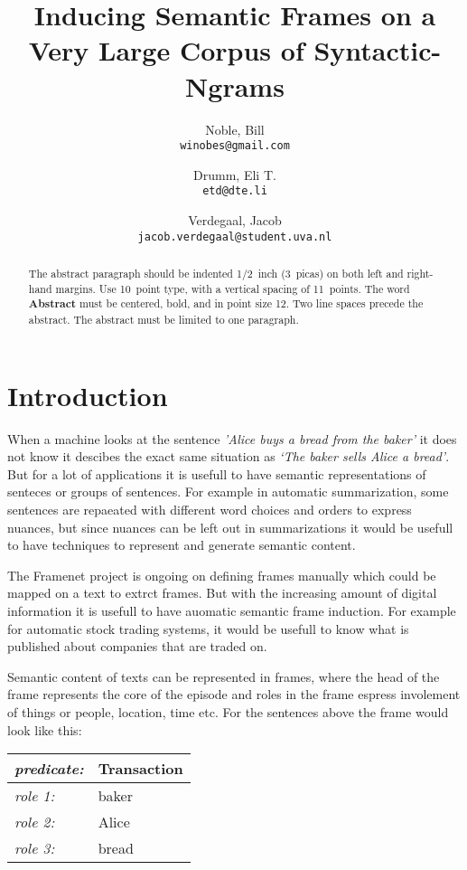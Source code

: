 \documentclass{article} %
\title{Inducing Semantic Frames on a Very Large Corpus of Syntactic-Ngrams}
\author{
    Noble, Bill\\
    \texttt{winobes@gmail.com}
    \and
    Drumm, Eli T.\\
    \texttt{etd@dte.li}
    \and
    Verdegaal, Jacob\\
    \texttt{jacob.verdegaal@student.uva.nl}
}
\begin{document}
\maketitle


\begin{abstract}
The abstract paragraph should be indented 1/2~inch (3~picas) on both left and
right-hand margins. Use 10~point type, with a vertical spacing of 11~points.
The word \textbf{Abstract} must be centered, bold, and in point size 12. Two
line spaces precede the abstract. The abstract must be limited to one
paragraph.
\end{abstract}

\section{Introduction}
When a machine looks at the sentence \textit{'Alice buys a bread from the baker'} it does not know it descibes the exact same situation as \textit{`The baker sells Alice a bread'}. But for a lot of applications it is usefull to have semantic representations of senteces or groups of sentences. For example in automatic summarization, some sentences are repaeated with different word choices and orders to express nuances, but since nuances can be left out in summarizations it would be usefull to have techniques to represent and generate semantic content. 

The Framenet project \citep{framenet} is ongoing on defining frames manually which could be mapped on a text to extrct frames. But with the increasing amount of digital information it is usefull to have auomatic semantic frame induction. For example for automatic stock trading systems, it would be usefull to know what is published about companies that are traded on. 

Semantic content of texts can be represented in frames, where the head of the frame represents the core of the episode and roles in the frame espress involement of things or people, location, time etc. For the sentences above the frame would look like this:\\

\begin{tabular}{|l l|}
  \hline
  \textit{\small predicate:\normalsize}&Transaction\\
  \hline
  \hline
  \textit{\small role 1:\normalsize} &baker\\
  \textit{\small role 2:\normalsize} &Alice\\
  \textit{\small role 3:\normalsize} &bread\\
  \hline
\end{tabular}\\
\end{document}
